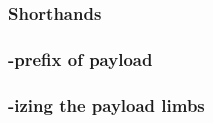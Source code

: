 \subsubsection{Shorthands                     } \label{rlp txn: phase constraints: payload: shorthands}            
\subsubsection{\rlp{}-prefix of payload       } \label{rlp txn: phase constraints: payload: payload size analysis} 
\subsubsection{\rlp{}-izing the payload limbs } \label{rlp txn: phase constraints: payload: limb content analysis} 
